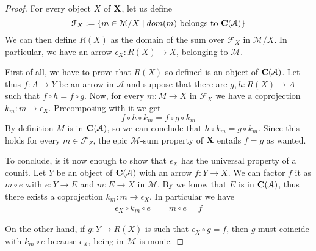 \documentclass[a4paper,UKenglish,cleveref,pdftex,thm-restate,numberwithinsect]{lipics-v2021}
\def\C{\textbf {\textup{C}}}
\def\X{\textbf {\textup{X}}}
\newcommand{\dm}[1]{\mathsf{dom}({#1})}
\begin{document}
\begin{proof}
	For every object $X$ of $\X$, let us define
	\[\mathcal{F}_X:=\{m\in \mathcal{M}/X \mid \dm{m} \text{ belongs to } \C(\mathcal{A})\}\] 
	We can then define $R(X)$ as the domain of the sum over $\mathcal{F}_X$ in $\mathcal{M}/X$. In particular, we have an arrow $\epsilon_X\colon R(X)\to X$, belonging to $\mathcal{M}$.
	
	First of all, we have to prove that $R(X)$ so defined is an object of $\C(\mathcal{A})$. Let thus $f\colon A\to Y$ be an arrow in $\mathcal{A}$ and suppose that there are $g,h\colon R(X)\to A$ such that  $f\circ h= f \circ g$. Now, for every $m\colon M\to X$ in $\mathcal{F}_X$ we have a coprojection $k_m\colon m\to \epsilon_X$. Precomposing with it we get
	\[f\circ h \circ k_m=f\circ g\circ k_m\]
	By definition $M$ is in $\C(\mathcal{A})$, so we can conclude that $h\circ k_m=g\circ k_m$. Since  this holds for every $m\in \mathcal{F}_Z$, the epic $\mathcal{M}$-sum property of $\X$ entails $f=g$ as wanted.
	
	To conclude, is it now enough to show that $\epsilon_X$ has the universal property of a counit. Let $Y$ be an object of $\C(\mathcal{A})$ with an arrow $f\colon Y\to X$. We can factor $f$ it as $m\circ e$ with $e\colon Y\to E$ and $m\colon E\to X$ in $\mathcal{M}$. By  we know that $E$ is in $\C(\mathcal{A})$, thus there exists a coprojection $k_m\colon m\to \epsilon_X$.  In particular we have
	\begin{align*}
		\epsilon_X\circ k_m\circ e&=m\circ e = f
	\end{align*}

On the other hand, if $g\colon Y\to R(X)$ is such that $\epsilon_X\circ g=f$, then $g$ must coincide with $k_m\circ e$ because $\epsilon_X$, being in $\mathcal{M}$ is monic.
\end{proof}

\begin{example}
\end{example}
\end{document}
